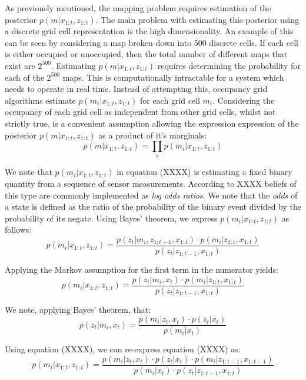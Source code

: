 \documentclass[a4paper]{article}
\begin{document}
As previously mentioned, the mapping problem requires estimation of the posterior $p(m | x_{1:t}, z_{1:t})$. The main problem with estimating this posterior using a discrete grid cell representation is the high dimensionality. An example of this can be seen  by considering a map broken down into 500 discrete cells. If each cell is either occupied or unoccupied, then the total number of different maps that exist are $2^{500}$. Estimating $p(m | x_{1:t}, z_{1:t})$ requires determining the probability for each of the $2^{500}$ maps. This is computationally intractable for a system which needs to operate in real time. Instead of attempting this, occupancy grid algorithms estimate $p(m_i | x_{1:t}, z_{1:t})$ for each grid cell $m_i$. Considering the occupancy of each grid cell as independent from other grid cells, whilst not strictly true, is a convenient assumption allowing the expression expression of the posterior $p(m | x_{1:t}, z_{1:t})$ as a product of it's marginals:
\begin{equation}
p(m | x_{1:t}, z_{1:t}) = \prod_{i} p(m_i | x_{1:t}, z_{1:t})
\end{equation}

We note that $p(m_i | x_{1:t}, z_{1:t})$ in equation (XXXX) is estimating a fixed binary quantity from a sequence of sensor measurements. According to XXXX beliefs of this type are commonly implemented as \textit{log odds ratios}. We note that the \textit{odds} of a state is defined as the ratio of the probability of the binary event divided by the probability of its negate. Using Bayes' theorem, we express $p(m_i | x_{1:t}, z_{1:t})$ as follows:
\begin{equation}
p(m_i | x_{1:t}, z_{1:t}) = \frac{p(z_t | m_i, z_{1:t-1}, x_{1:t}) \cdot p(m_i | z_{1:t}, x_{1:t})}{p(z_t | z_{1:t-1}, x_{1:t})}
\end{equation}

Applying the Markov assumption for the first term in the numerator yields:
\begin{equation}
p(m_i | x_{1:t}, z_{1:t}) = \frac{p(z_t | m_i, x_{t}) \cdot p(m_i | z_{1:t}, x_{1:t})}{p(z_t | z_{1:t-1}, x_{1:t})}
\end{equation}

We note, applying Bayes' theorem, that:
\begin{equation}
p(z_t | m_i, x_t) = \frac{p(m_i | z_t, x_t) \cdot p(z_t | x_t)}{p(m_i | x_t)}
\end{equation}

Using equation (XXXX), we can re-express equation (XXXX) as:
\begin{equation}
p(m_i | x_{1:t}, z_{1:t}) = \frac{p(m_i | z_t, x_t) \cdot p(z_t | x_t) \cdot p(m_i | z_{1:t-1}, x_{1:t-1})}{p(m_i | x_t) \cdot p(z_t | z_{1:t-1}, x_{1:t})}
\end{equation}
\end{document}
